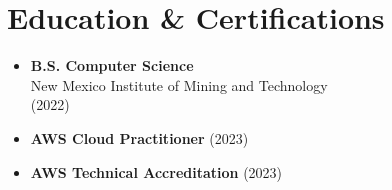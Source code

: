 \documentclass[11pt,letterpaper]{article}
\begin{document}
\section{Education \& Certifications}
\begin{multicols}{2}
    \begin{itemize}
        \item \textbf{B.S. Computer Science} \\ New Mexico Institute of Mining and Technology \\ (2022)
    \end{itemize}
    \columnbreak
    \begin{itemize}
        \item \textbf{AWS Cloud Practitioner} (2023)
        \item \textbf{AWS Technical Accreditation} (2023)
    \end{itemize}
\end{multicols}
\end{document}
